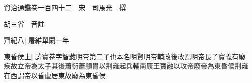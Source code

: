 






























































資治通鑑卷一百四十二　宋　司馬光　撰

胡三省　音註

齊紀八|{
	屠維單閼一年}


東昏侯上|{
	諱寶卷字智藏明帝第二子也本名明賢明帝輔政後改焉明帝長子寶義有廢疾故立帝為太子其後蕭衍蕭頴胄以荆雍起兵輔南康王寶融以攻帝廢帝為東昏侯荆雍在西謂帝以昏虐居東故廢為東昏侯}


